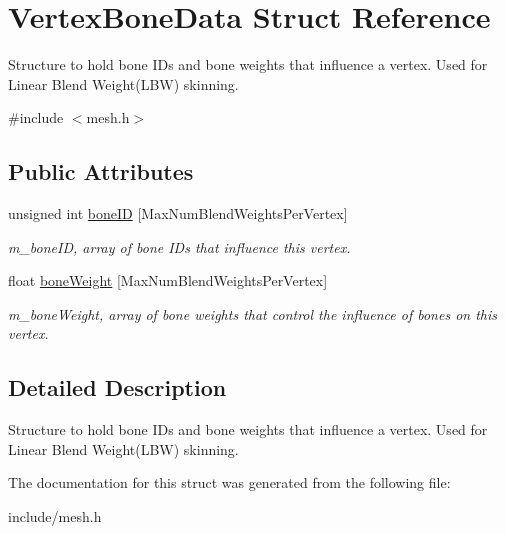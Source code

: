 \hypertarget{structVertexBoneData}{}\section{Vertex\+Bone\+Data Struct Reference}
\label{structVertexBoneData}


Structure to hold bone I\+Ds and bone weights that influence a vertex. Used for Linear Blend Weight(\+L\+B\+W) skinning.  




{\ttfamily \#include $<$mesh.\+h$>$}

\subsection*{Public Attributes}
\begin{DoxyCompactItemize}
\item 
unsigned int \hyperlink{structVertexBoneData_a6629bd01077f6adfbd2e632d71c62acb}{bone\+ID} \mbox{[}Max\+Num\+Blend\+Weights\+Per\+Vertex\mbox{]}\hypertarget{structVertexBoneData_a6629bd01077f6adfbd2e632d71c62acb}{}\label{structVertexBoneData_a6629bd01077f6adfbd2e632d71c62acb}

\begin{DoxyCompactList}\small\item\em m\+\_\+bone\+ID, array of bone ID\textquotesingle{}s that influence this vertex. \end{DoxyCompactList}\item 
float \hyperlink{structVertexBoneData_a2c0bb02c5372c9be2fed58625375ad87}{bone\+Weight} \mbox{[}Max\+Num\+Blend\+Weights\+Per\+Vertex\mbox{]}\hypertarget{structVertexBoneData_a2c0bb02c5372c9be2fed58625375ad87}{}\label{structVertexBoneData_a2c0bb02c5372c9be2fed58625375ad87}

\begin{DoxyCompactList}\small\item\em m\+\_\+bone\+Weight, array of bone weights that control the influence of bones on this vertex. \end{DoxyCompactList}\end{DoxyCompactItemize}


\subsection{Detailed Description}
Structure to hold bone I\+Ds and bone weights that influence a vertex. Used for Linear Blend Weight(\+L\+B\+W) skinning. 

The documentation for this struct was generated from the following file\+:\begin{DoxyCompactItemize}
\item 
include/mesh.\+h\end{DoxyCompactItemize}

